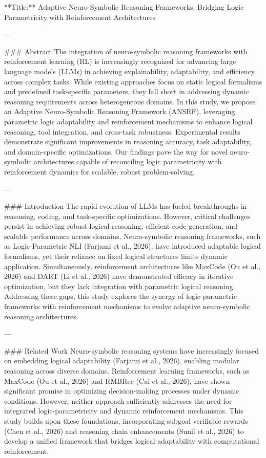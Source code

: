 **Title:** Adaptive Neuro-Symbolic Reasoning Frameworks: Bridging Logic Parametricity with Reinforcement Architectures  

---

### Abstract  
The integration of neuro-symbolic reasoning frameworks with reinforcement learning (RL) is increasingly recognized for advancing large language models (LLMs) in achieving explainability, adaptability, and efficiency across complex tasks. While existing approaches focus on static logical formalisms and predefined task-specific parameters, they fall short in addressing dynamic reasoning requirements across heterogeneous domains. In this study, we propose an Adaptive Neuro-Symbolic Reasoning Framework (ANSRF), leveraging parametric logic adaptability and reinforcement mechanisms to enhance logical reasoning, tool integration, and cross-task robustness. Experimental results demonstrate significant improvements in reasoning accuracy, task adaptability, and domain-specific optimizations. Our findings pave the way for novel neuro-symbolic architectures capable of reconciling logic parametricity with reinforcement dynamics for scalable, robust problem-solving.

---

### Introduction  
The rapid evolution of LLMs has fueled breakthroughs in reasoning, coding, and task-specific optimizations. However, critical challenges persist in achieving robust logical reasoning, efficient code generation, and scalable performance across domains. Neuro-symbolic reasoning frameworks, such as Logic-Parametric NLI (Farjami et al., 2026), have introduced adaptable logical formalisms, yet their reliance on fixed logical structures limits dynamic application. Simultaneously, reinforcement architectures like MaxCode (Ou et al., 2026) and DART (Li et al., 2026) have demonstrated efficacy in iterative optimization, but they lack integration with parametric logical reasoning. Addressing these gaps, this study explores the synergy of logic-parametric frameworks with reinforcement mechanisms to evolve adaptive neuro-symbolic reasoning architectures.

---

### Related Work  
Neuro-symbolic reasoning systems have increasingly focused on embedding logical adaptability (Farjami et al., 2026), enabling modular reasoning across diverse domains. Reinforcement learning frameworks, such as MaxCode (Ou et al., 2026) and RMBRec (Cai et al., 2026), have shown significant promise in optimizing decision-making processes under dynamic conditions. However, neither approach sufficiently addresses the need for integrated logic-parametricity and dynamic reinforcement mechanisms. This study builds upon these foundations, incorporating subgoal verifiable rewards (Chen et al., 2026) and reasoning chain enhancements (Sunil et al., 2026) to develop a unified framework that bridges logical adaptability with computational reinforcement.

